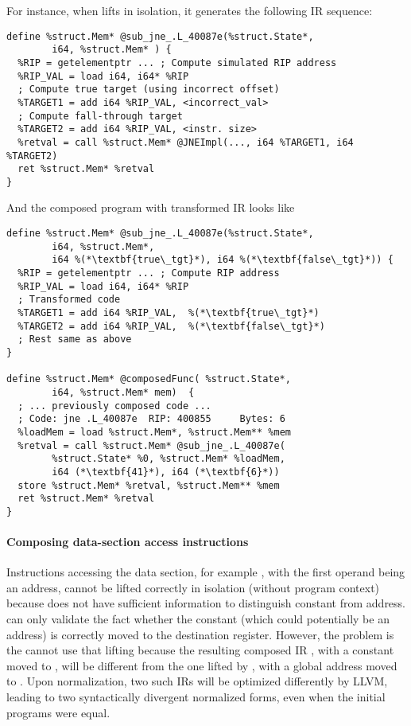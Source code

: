 For instance, when \mcsema lifts  in isolation,
it generates the following IR sequence:
\begin{lstlisting}[style=LLVM]
define %struct.Mem* @sub_jne_.L_40087e(%struct.State*, 
        i64, %struct.Mem* ) {
  %RIP = getelementptr ... ; Compute simulated RIP address
  %RIP_VAL = load i64, i64* %RIP
  ; Compute true target (using incorrect offset)
  %TARGET1 = add i64 %RIP_VAL, <incorrect_val>
  ; Compute fall-through target
  %TARGET2 = add i64 %RIP_VAL, <instr. size>
  %retval = call %struct.Mem* @JNEImpl(..., i64 %TARGET1, i64 %TARGET2)
  ret %struct.Mem* %retval
}
\end{lstlisting}

And the composed program with transformed IR looks like
\begin{lstlisting}[style=LLVM]
define %struct.Mem* @sub_jne_.L_40087e(%struct.State*, 
        i64, %struct.Mem*,
        i64 %(*\textbf{true\_tgt}*), i64 %(*\textbf{false\_tgt}*)) {
  %RIP = getelementptr ... ; Compute RIP address
  %RIP_VAL = load i64, i64* %RIP
  ; Transformed code
  %TARGET1 = add i64 %RIP_VAL,  %(*\textbf{true\_tgt}*)
  %TARGET2 = add i64 %RIP_VAL,  %(*\textbf{false\_tgt}*)
  ; Rest same as above
}

define %struct.Mem* @composedFunc( %struct.State*, 
        i64, %struct.Mem* mem)  {
  ; ... previously composed code ...
  ; Code: jne .L_40087e	 RIP: 400855	 Bytes: 6
  %loadMem = load %struct.Mem*, %struct.Mem** %mem
  %retval = call %struct.Mem* @sub_jne_.L_40087e(
        %struct.State* %0, %struct.Mem* %loadMem, 
        i64 (*\textbf{41}*), i64 (*\textbf{6}*))
  store %struct.Mem* %retval, %struct.Mem** %mem
  ret %struct.Mem* %retval
}
\end{lstlisting}

\paragraph{Composing data-section access instructions}
Instructions accessing the data section, for example ,
with the first operand being an address, cannot be lifted correctly in
isolation (without program context) because \mcsema does not have sufficient information to distinguish constant from address. 
\Siv can only validate the fact whether the constant
(which could potentially be an address) is correctly moved to the destination register. 
However, the problem is the \plv cannot use that lifting because the resulting 
composed IR , with a constant moved to , will be   
different from the
one lifted by \mcsema {}, with a global address moved to .
Upon normalization, two such IRs will be optimized differently by LLVM, leading to two syntactically 
divergent normalized forms, even when the initial programs were equal.


